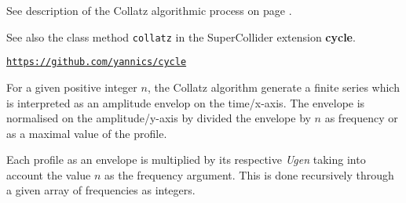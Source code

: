 See description of the Collatz algorithmic process on page \pageref{colres}. 

See also the class method \texttt{collatz} in the SuperCollider extension \textbf{cycle}. %

\href{https://github.com/yannics/cl-mst}{\texttt{\small https://github.com/yannics/cycle}}

\bigskip
For a given positive integer $n$, the Collatz algorithm generate a finite series which is interpreted as an amplitude envelop on the time/x-axis. The envelope is normalised on the amplitude/y-axis by divided the envelope by $n$ as frequency or as a maximal value of the profile. 

\bigskip

Each profile as an envelope is multiplied by its respective \textit{Ugen} taking into account the value $n$ as the frequency argument. This is done recursively through a given array of frequencies as integers.


